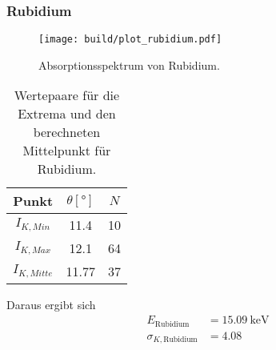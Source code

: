 \clearpage
\subsubsection*{Rubidium}
    \begin{figure}[H]
    \centering
    \texttt{[image: build/plot\_rubidium.pdf]}
    \caption{Absorptionsspektrum von Rubidium.}
\label{fig:rubidium}
\end{figure}
\begin{table}[H]                                                                                   
    \centering                                                                                     
        \caption{Wertepaare für die Extrema und den berechneten Mittelpunkt für Rubidium.}                      
        \label{tab:Rb}                                                                        
        \begin{tabular}{S S[table-format=2.2] S}                                                   
          \toprule                                                                                 
          {Punkt} & {$\theta [\si{\degree}]$} & {$N$}\\                                            
          \midrule                                                                                 
          {$I_{K,Min  }$} &11.4&10\\
          {$I_{K,Max  }$} &12.1&64\\
          {$I_{K,Mitte}$} &11.77&37\\
          \bottomrule                                                                              
        \end{tabular}                                                                              
      \end{table}                                                                                  
Daraus ergibt sich                                                                                 
\begin{align*}                                                                                     
    E_\text{Rubidium} &= \SI{15.09}{\kilo\electronvolt}\\                  
    \sigma_{K, \text{Rubidium}} &= \num{4.08}                      
\end{align*}                                                                                       

